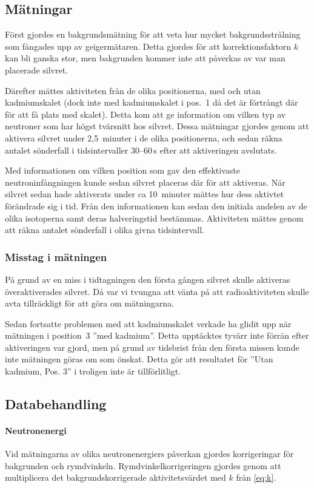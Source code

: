 \documentclass[11pt,a4paper, english, swedish
]{article}
\begin{document}
\subsection{Mätningar}
Först gjordes en bakgrundsmätning för att veta hur mycket bakgrundsstrålning som fångades upp av geigermätaren. Detta gjordes för att korrektionsfaktorn $k$ kan bli ganska stor, men bakgrunden kommer inte att påverkas av var man placerade silvret. 

Därefter mättes aktiviteten från de olika positionerna, med och utan kadmiumskalet (dock inte med kadmiumskalet i pos.~1 då det är förtrångt där för att få plats med skalet). Detta kom att ge information om vilken typ av neutroner som har högst tvärsnitt hos silvret. Dessa mätningar gjordes genom att aktivera silvret under 2,5~minuter i de olika positionerna, och sedan räkna antalet sönderfall i tidsintervaller 30--60\,s efter att aktiveringen avslutats. 

Med informationen om vilken position som gav den effektivaste neutroninfångningen kunde sedan silvret placeras där för att aktiveras. När silvret sedan hade aktiverats under ca 10~minuter mättes hur dess aktivtet förändrade sig i tid. Från den informationen kan sedan den initiala andelen av de olika isotoperna samt deras halveringstid bestämmas. Aktiviteten mättes genom att räkna antalet sönderfall i olika givna tidsintervall. 

\subsubsection{Misstag i mätningen}
På grund av en miss i tidtagningen den första gången silvret skulle aktiveras överaktiverades silvret. Då var vi tvungna att vänta på att radioaktiviteten skulle avta tillräckligt för att göra om mätningarna. 

Sedan fortsatte problemen med att kadmiumskalet verkade ha glidit upp när mätningen i position~3 ''med kadmium''. Detta upptäcktes tyvärr inte förrän efter aktiveringen var gjord, men på grund av tidsbrist från den första missen kunde inte mätningen göras om som önskat. Detta gör att resultatet för ''Utan kadmium, Pos. 3'' i  troligen inte är tillförlitligt. 


\subsection{Databehandling} \label{sec:databehandling}
\paragraph{Neutronenergi}
Vid mätningarna av olika neutronenergiers påverkan gjordes korrigeringar för bakgrunden och rymdvinkeln. Rymdvinkelkorrigeringen gjordes genom att multiplicera det bakgrundskorrigerade aktivitetsvärdet med $k$ från \eqref{eq:k}.
\end{document}
